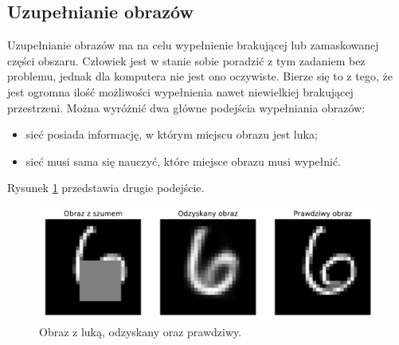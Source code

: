 \documentclass[a4paper,12pt,oneside]{book} %
\begin{document}
\subsection{Uzupełnianie obrazów}
Uzupełnianie obrazów ma na celu wypełnienie brakującej lub zamaskowanej części obszaru. Człowiek jest w stanie sobie poradzić z tym zadaniem bez problemu, jednak dla komputera nie jest ono oczywiste. Bierze się to z tego, że jest ogromna ilość możliwości wypełnienia nawet niewielkiej brakującej przestrzeni. 
Można wyróżnić dwa główne podejścia wypełniania obrazów:
\begin{itemize}
	\item sieć posiada informację, w którym miejscu obrazu jest luka;
	\item sieć musi sama się nauczyć, które miejsce obrazu musi wypełnić.
\end{itemize}
Rysunek \ref{fig:lukaae} przedstawia drugie podejście. 
\begin{figure}[h]
	\centering\includegraphics[width=14.5cm]{completionae.pdf}
	\caption{Obraz z luką, odzyskany oraz prawdziwy.}
	\label{fig:lukaae}
\end{figure}
\end{document}
